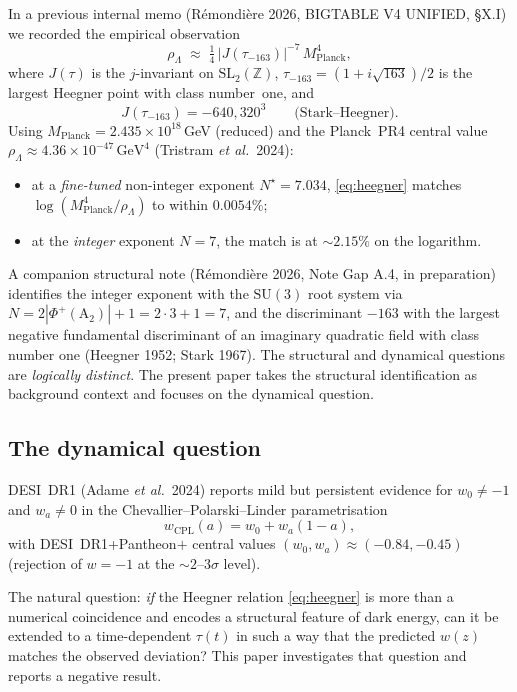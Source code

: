 \documentclass[11pt,letterpaper,twoside]{article}
\newcommand{\Mpl}{M_{\mathrm{Planck}}}
\newcommand{\rL}{\rho_{\Lambda}}
\newcommand{\SUthree}{\mathrm{SU}(3)}
\newcommand{\Heegner}{\tau_{-163}}
\begin{document}
In a previous internal memo (R\'emondi\`ere 2026, BIGTABLE V4 UNIFIED, \S X.I)
we recorded the empirical observation
\begin{equation}\label{eq:heegner}
  \rL\;\approx\;\tfrac{1}{4}\,\bigl|J(\Heegner)\bigr|^{-7}\,\Mpl^{4},
\end{equation}
where $J(\tau)$ is the $j$-invariant on $\mathrm{SL}_{2}(\mathbb{Z})$,
$\Heegner=(1+i\sqrt{163})/2$ is the largest Heegner point with class number~one,
and
\begin{equation}
  J(\Heegner)=-640{,}320^{3} \qquad\text{(Stark--Heegner).}
\end{equation}
Using $\Mpl=2.435\times10^{18}$\,GeV (reduced) and the Planck~PR4 central value
$\rL\approx4.36\times10^{-47}\,\mathrm{GeV}^{4}$ (Tristram \emph{et al.}~2024):
\begin{itemize}[leftmargin=*,topsep=0.2em,itemsep=0.1em]
\item at a \emph{fine-tuned} non-integer exponent $N^{\star}=7.034$, \eqref{eq:heegner}
      matches $\log(\Mpl^{4}/\rL)$ to within $0.0054\%$;
\item at the \emph{integer} exponent $N=7$, the match is at $\sim 2.15\%$ on the
      logarithm.
\end{itemize}
A companion structural note (R\'emondi\`ere 2026, Note Gap A.4, in preparation)
identifies the integer exponent with the $\SUthree$ root system via
$N=2|\Phi^{+}(\mathrm{A}_{2})|+1=2\cdot3+1=7$, and the discriminant $-163$ with
the largest negative fundamental discriminant of an imaginary quadratic field
with class number one (Heegner 1952; Stark 1967).
The structural and dynamical questions are \emph{logically distinct}.
The present paper takes the structural identification as background context
and focuses on the dynamical question.

\subsection{The dynamical question}

DESI~DR1 (Adame \emph{et al.}~2024) reports mild but persistent evidence for
$w_{0}\neq-1$ and $w_{a}\neq0$ in the Chevallier--Polarski--Linder
parametrisation
\begin{equation}
  w_{\mathrm{CPL}}(a)=w_{0}+w_{a}(1-a),
\end{equation}
with DESI~DR1+Pantheon$+$ central values $(w_{0},w_{a})\approx(-0.84,-0.45)$
(rejection of $w=-1$ at the $\sim2$--$3\sigma$ level).

The natural question: \emph{if} the Heegner relation \eqref{eq:heegner} is more
than a numerical coincidence and encodes a structural feature of dark energy,
can it be extended to a time-dependent $\tau(t)$ in such a way that the predicted
$w(z)$ matches the observed deviation? This paper investigates that question
and reports a negative result.
\end{document}
